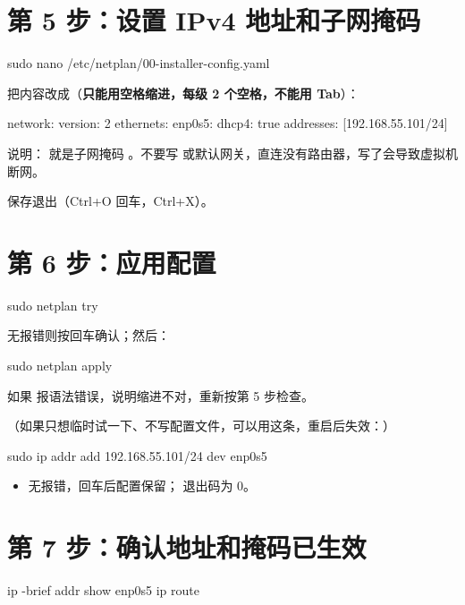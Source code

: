 \section{第 5 步：设置 IPv4 地址和子网掩码}
\label{step:5}
\begin{command}
sudo nano /etc/netplan/00-installer-config.yaml
\end{command}

把内容改成（\textbf{只能用空格缩进，每级 2 个空格，不能用 Tab}）：

\begin{command}
network:
  version: 2
  ethernets:
    enp0s5:
      dhcp4: true
      addresses: [192.168.55.101/24]
\end{command}

说明： 就是子网掩码 。不要写  或默认网关，直连没有路由器，写了会导致虚拟机断网。

保存退出（Ctrl+O 回车，Ctrl+X）。

\section{第 6 步：应用配置}
\label{step:6}
\begin{command}
sudo netplan try
\end{command}

无报错则按回车确认；然后：

\begin{command}
sudo netplan apply
\end{command}

如果  报语法错误，说明缩进不对，重新按第 5 步检查。

（如果只想临时试一下、不写配置文件，可以用这条，重启后失效：）

\begin{command}
sudo ip addr add 192.168.55.101/24 dev enp0s5
\end{command}

\begin{expected}
\begin{itemize}
\item {} 无报错，回车后配置保留； 退出码为 0。
\end{itemize}
\end{expected}

\section{第 7 步：确认地址和掩码已生效}
\label{step:7}
\begin{command}
ip -brief addr show enp0s5
ip route
\end{command}

